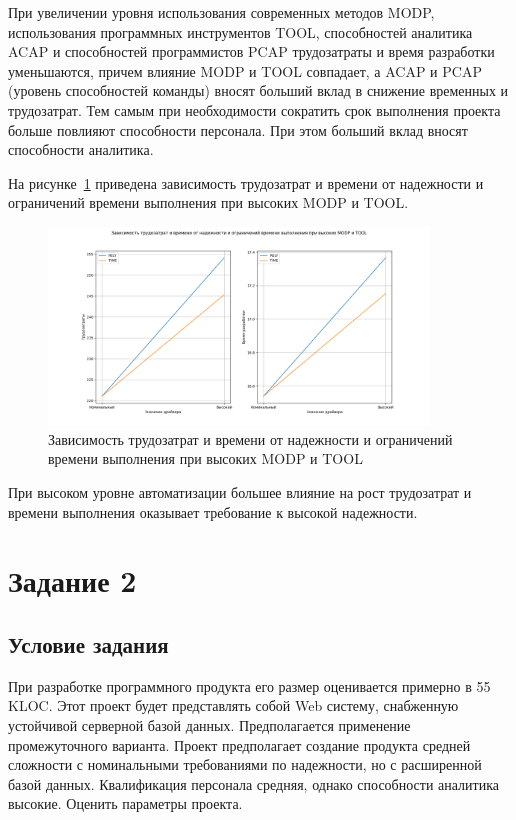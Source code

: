 При увеличении уровня использования современных методов MODP, использования программных инструментов TOOL, способностей аналитика ACAP и способностей программистов PCAP трудозатраты и время разработки уменьшаются, причем влияние MODP и TOOL совпадает, а ACAP и PCAP (уровень способностей команды) вносят больший вклад в снижение временных и трудозатрат.
Тем самым при необходимости сократить срок выполнения проекта больше повлияют способности персонала.
При этом больший вклад вносят способности аналитика.

На рисунке~\ref{fig:screen3} приведена зависимость трудозатрат и времени от надежности и ограничений времени выполнения при высоких MODP и TOOL.

\begin{figure}[H]
	\centering
	\includegraphics[width=0.9\textwidth]{img/task1_2.png}
	\caption{Зависимость трудозатрат и времени от надежности и ограничений времени выполнения при высоких MODP и TOOL}
	\label{fig:screen3}
\end{figure}

При высоком уровне автоматизации большее влияние на рост трудозатрат и времени выполнения оказывает требование к высокой надежности.

\section{Задание 2}

\subsection{Условие задания}

При разработке программного продукта его размер оценивается примерно в 55 KLOC. Этот проект будет представлять собой Web систему, снабженную устойчивой серверной базой данных. 
Предполагается применение промежуточного варианта. Проект предполагает создание продукта средней сложности с номинальными требованиями по надежности, но с расширенной базой данных. 
Квалификация персонала средняя, однако способности аналитика высокие. Оценить параметры проекта.

